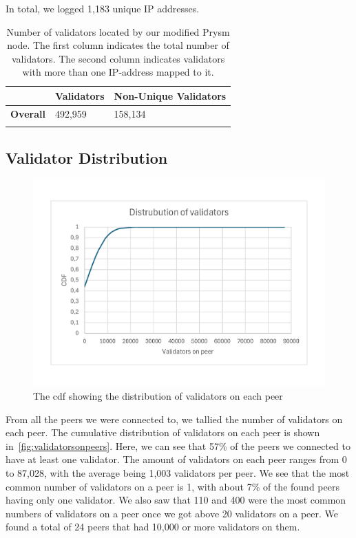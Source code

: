 In total, we logged 1,183 unique IP addresses.


\begin{table}[]
    \centering
    \caption{Number of validators located by our modified Prysm node. The first column indicates the total number of validators. The second column indicates validators with more than one IP-address mapped to it.}
    \begin{tabular}{lll}
        \hline
        & \textbf{Validators} & \textbf{Non-Unique Validators} \\ \hline
        \textbf{Overall} & 492,959             & 158,134                        \\ \hline
        \\
    \end{tabular}
    \label{tab:unique vals}
\end{table}

\subsection{Validator Distribution}\label{subsec:validator-distribution}
\begin{figure}[!ht]
    \centering
    \includegraphics[scale = 0.45]{figures/distval}
    \caption{The cdf showing the distribution of validators on each peer}
    \label{fig:validatorsonpeers}
\end{figure}
From all the peers we were connected to, we tallied the number of validators on each peer.
The cumulative distribution of validators on each peer is shown in~\autoref{fig:validatorsonpeers}.
Here, we can see that 57\% of the peers we connected to have at least one validator.
The amount of validators on each peer ranges from 0 to 87,028, with the average being 1,003 validators per peer.
We see that the most common number of validators on a peer is 1, with about 7\% of the found peers having only one validator.
We also saw that 110 and 400 were the most common numbers of validators on a peer once we got above 20 validators on a peer.
We found a total of 24 peers that had 10,000 or more validators on them.